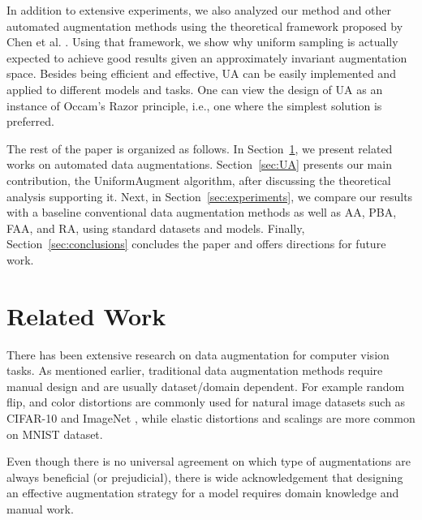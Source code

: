 \documentclass[runningheads]{llncs}
\begin{document}
	In addition to extensive experiments, we also analyzed our method and other automated augmentation methods using the theoretical framework proposed by Chen et al. \cite{chen2019invariance}. Using that framework, we show why uniform sampling is actually expected to achieve good results given an approximately invariant augmentation space. Besides being efficient and effective, UA can be easily implemented and applied to different models and tasks. One can view the design of UA as an instance of Occam’s Razor principle, i.e., one where the simplest solution is preferred. 
	
	The rest of the paper is organized as follows. In Section~\ref{sec: related work}, we present related works on automated data augmentations.
Section~\ref{sec:UA} presents our main contribution, the UniformAugment algorithm, after discussing the theoretical analysis supporting it. Next, in Section~\ref{sec:experiments}, we compare our results with a baseline conventional data augmentation methods as well as AA, PBA, FAA, and RA, using standard datasets and models. Finally, Section~\ref{sec:conclusions} concludes the paper and offers directions for future work.
	
	\section{Related Work}
	\label{sec: related work}
	


	There has been extensive research on data augmentation for computer vision tasks. As mentioned earlier, traditional data augmentation methods require manual design and are usually dataset/domain dependent. For example random flip, and color distortions are commonly used for natural image datasets such as CIFAR-10 \cite{krizhevsky2009learning} and ImageNet \cite{deng2009imagenet}, while elastic distortions and scalings are more common on MNIST \cite{sato2015apac,simard2003best} dataset.
\begin{comment}
	The use of some augmentation methods like Mixup \cite{zhang2017mixup}, CutOut \cite{cutout} and CutMix \cite{yun2019cutmix}  has shown to improve the trained model's performance. CutOut and CutMix either mask or replace a certain portion of the image randomly while Mixup trains the network on convex combinations of images and their corresponding labels. However, it has been observed that while CutOut works well for CIFAR-10, it does not on ImageNet \cite{cubuk2019autoaugment}. Therefore, designing an effective augmentation strategy for a model with these methods requires domain knowledge and manual work.  
	\end{comment}
Even though there is no universal agreement on which type of augmentations are always beneficial (or prejudicial), there is wide acknowledgement that designing an effective augmentation strategy for a model  requires domain knowledge and manual work.
	
\end{document}
